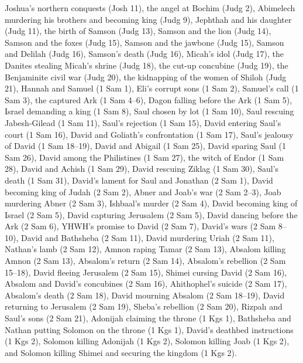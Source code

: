 {{{Joshua’s northern conquests (Josh 11), the angel at Bochim (Judg 2), Abimelech murdering his brothers and becoming king (Judg 9), Jephthah and his daughter (Judg 11), the birth of Samson (Judg 13), Samson and the lion (Judg 14), Samson and the foxes (Judg 15), Samson and the jawbone (Judg 15), Samson and Delilah (Judg 16), Samson’s death (Judg 16), Micah’s idol (Judg 17), the Danites stealing Micah’s shrine (Judg 18), the cut-up concubine (Judg 19), the Benjaminite civil war (Judg 20), the kidnapping of the women of Shiloh (Judg 21), Hannah and Samuel (1 Sam 1), Eli’s corrupt sons (1 Sam 2), Samuel’s call (1 Sam 3), the captured Ark (1 Sam 4–6), Dagon falling before the Ark (1 Sam 5), Israel demanding a king (1 Sam 8), Saul chosen by lot (1 Sam 10), Saul rescuing Jabesh-Gilead (1 Sam 11), Saul’s rejection (1 Sam 15), David entering Saul’s court (1 Sam 16), David and Goliath’s confrontation (1 Sam 17), Saul’s jealousy of David (1 Sam 18–19), David and Abigail (1 Sam 25), David sparing Saul (1 Sam 26), David among the Philistines (1 Sam 27), the witch of Endor (1 Sam 28), David and Achish (1 Sam 29), David rescuing Ziklag (1 Sam 30), Saul’s death (1 Sam 31), David’s lament for Saul and Jonathan (2 Sam 1), David becoming king of Judah (2 Sam 2), Abner and Joab’s war (2 Sam 2–3), Joab murdering Abner (2 Sam 3), Ishbaal’s murder (2 Sam 4), David becoming king of Israel (2 Sam 5), David capturing Jerusalem (2 Sam 5), David dancing before the Ark (2 Sam 6), YHWH’s promise to David (2 Sam 7), David’s wars (2 Sam 8–10), David and Bathsheba (2 Sam 11), David murdering Uriah (2 Sam 11), Nathan’s lamb (2 Sam 12), Amnon raping Tamar (2 Sam 13), Absalom killing Amnon (2 Sam 13), Absalom’s return (2 Sam 14), Absalom’s rebellion (2 Sam 15–18), David fleeing Jerusalem (2 Sam 15), Shimei cursing David (2 Sam 16), Absalom and David’s concubines (2 Sam 16), Ahithophel’s suicide (2 Sam 17), Absalom’s death (2 Sam 18), David mourning Absalom (2 Sam 18–19), David returning to Jerusalem (2 Sam 19), Sheba’s rebellion (2 Sam 20), Rizpah and Saul’s sons (2 Sam 21), Adonijah claiming the throne (1 Kgs 1), Bathsheba and Nathan putting Solomon on the throne (1 Kgs 1), David’s deathbed instructions (1 Kgs 2), Solomon killing Adonijah (1 Kgs 2), Solomon killing Joab (1 Kgs 2), and Solomon killing Shimei and securing the kingdom (1 Kgs 2).

		}
	}





}

